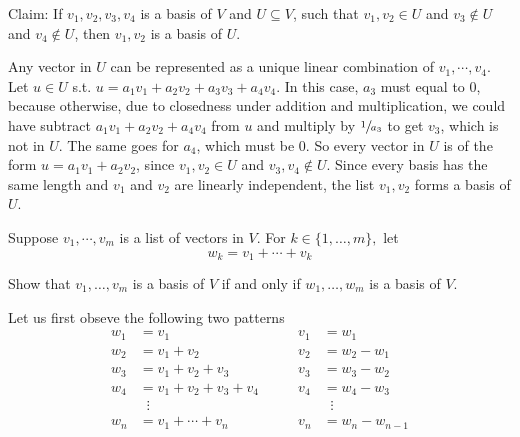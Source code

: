 \begin{xrcs}
  Claim: If $v_1, v_2, v_3, v_4$ is a basis of $V$ and $U \subseteq V$, such that $v_1, v_2 \in U$ and $v_3 \notin U$ and $v_4 \notin U$, then $v_1, v_2$ is a basis of $U$.
\end{xrcs}
\begin{prf}
  Any vector in $U$ can be represented as a unique linear combination of $v_1, \cdots, v_4$. Let $u\in U$ s.t. $u=a_1 v_1 + a_2 v_2 + a_3 v_3 + a_4 v_4$. In this case, $a_3$ must equal to $0$, because otherwise, due to closedness under addition and multiplication, we could have subtract $a_1 v_1 + a_2 v_2+a_4v_4$ from $u$ and multiply by $\sfrac{1}{a_3}$ to get $v_3$, which is not in $U$. The same goes for $a_4$, which must be $0$. So every vector in $U$ is of the form $u=a_1 v_1 + a_2 v_2$, since $v_1, v_2 \in U$ and $v_3, v_4 \notin U$. Since every basis has the same length and $v_1$ and $v_2$ are linearly independent, the list $v_1, v_2$ forms a basis of $U$.
\end{prf}

\begin{xrcs}
  Suppose $v_1, \cdots, v_m$ is a list of vectors in $V$. For $k \in \{1, \ldots, m\},$ let
  \begin{equation}
    w_k = v_1 + \cdots + v_k
  \end{equation}
  
  Show that $v_1, \ldots, v_m$ is a basis of $V$ if and only if $w_1, \ldots, w_m$ is a basis of $V$.
\end{xrcs}
\begin{prf}
  Let us first obseve the following two patterns
  \begin{equation}
    \begin{aligned}
      w_1 &= v_1                    & \qquad v_1 &= w_1       \\
      w_2 &= v_1 + v_2              & \qquad v_2 &= w_2 - w_1 \\
      w_3 &= v_1 + v_2 + v_3        & \qquad v_3 &= w_3 - w_2 \\
      w_4 &= v_1 + v_2 + v_3 + v_4  & \qquad v_4 &= w_4 - w_3 \\
          &\;\;\vdots               &            &\;\;\vdots \\
      w_n &= v_1 + \cdots + v_n     & \qquad v_n &= w_n - w_{n-1}
    \end{aligned}
  \end{equation}
\end{prf}
